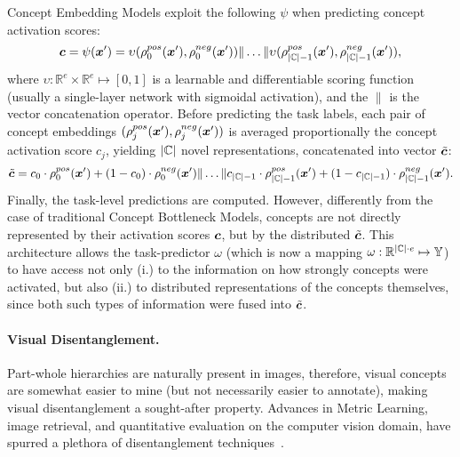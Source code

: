 Concept Embedding Models exploit the following $\psi$ when predicting concept activation scores:
\begin{equation*}
	{\bm{c}} = \psi({\bm{x}}') = \upsilon(\rho_0^{pos}({\bm{x}}'), \rho_0^{neg}({\bm{x}}')) \| \ldots  \| \upsilon(\rho_{|{\mathbb{C}}|-1}^{pos}({\bm{x}}'), \rho_{|{\mathbb{C}}|-1}^{neg}({\bm{x}}')),
\end{equation*} 
where $\upsilon \colon \mathbb{R}^{e} \times \mathbb{R}^{e} \mapsto [0,1]$ is a learnable and differentiable scoring function (usually a single-layer network with sigmoidal activation), and the $\|$ is the vector concatenation operator. Before predicting the task labels, each pair of concept embeddings $(\rho_j^{pos}({\bm{x}}'),\rho_j^{neg}({\bm{x}}'))$ %
is averaged proportionally the concept activation score $c_j$, yielding $|{\mathbb{C}}|$ novel representations, concatenated into vector $\tilde{{\bm{c}}}$:
\begin{equation*}
	\tilde{{\bm{c}}} = {c}_0 \cdot \rho_0^{pos}({\bm{x}}') + (1 - {c}_0) \cdot \rho_0^{neg}({\bm{x}}') \| \dots \| {c}_{|{\mathbb{C}}|-1} \cdot \rho_{|{\mathbb{C}}|-1}^{pos}({\bm{x}}') + (1 - {c}_{|{\mathbb{C}}|-1}) \cdot \rho_{|{\mathbb{C}}|-1}^{neg}({\bm{x}}').
\end{equation*}
Finally, the task-level predictions are computed. However, differently from the case of traditional Concept Bottleneck Models, concepts are not directly represented by their activation scores ${\bm{c}}$, but by the distributed $\tilde{{\bm{c}}}$. %
This architecture allows the task-predictor $\omega$ (which is now a mapping $\omega: \mathbb{R}^{|{\mathbb{C}}|\cdot e} \mapsto {\mathbb{Y}}$) to have access not only (i.) to the information on how strongly concepts were activated, but also (ii.) to distributed representations of the concepts themselves, since both such types of information were fused into $\tilde{{\bm{c}}}$. %


\paragraph{Visual Disentanglement.} Part-whole hierarchies are naturally present in images, therefore, visual concepts are somewhat easier to mine (but not necessarily easier to annotate), making visual disentanglement a sought-after property.
Advances in Metric Learning, image retrieval, and quantitative evaluation on the computer vision domain, have spurred a plethora of disentanglement techniques~\cite{zhang2018visual}.

